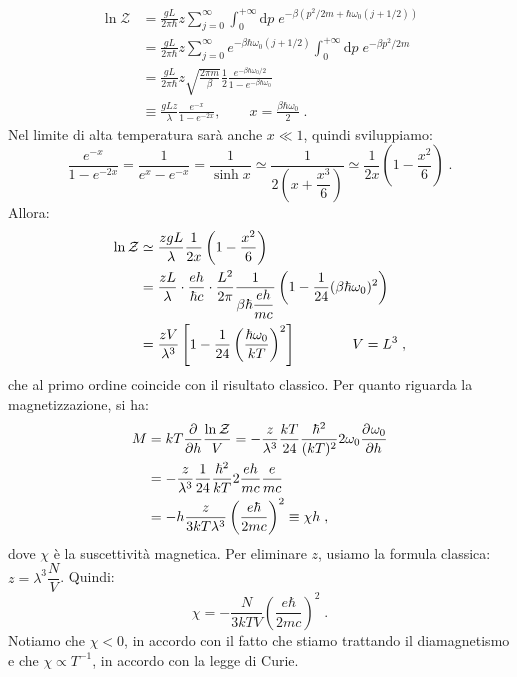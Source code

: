 \documentclass[10pt,a4paper]{report}
\theoremstyle{definition}
\newcommand{\pdev}[3][]{\frac{\partial^{#1} #2}{\partial #3^{#1}}}
\numberwithin{equation}{section}
\newcommand{\diff}[1][]{\mathrm{d}#1}
\newcommand{\zpart}{\mathcal{Z}}
\begin{document}
\begin{align*}
\ln\zpart&=\frac{gL}{2\pi\hbar}z\sum_{j=0}^{\infty}\int_0^{+\infty}\diff{p}\;e^{-\beta(p^2/2m+\hbar\omega_0(j+1/2))} \\
&= \frac{gL}{2\pi\hbar}z\sum_{j=0}^{\infty}e^{-\beta\hbar\omega_0(j+1/2)}\int_0^{+\infty}\diff{p}\;e^{-\beta p^2/2m} \\
&= \frac{gL}{2\pi\hbar}z\sqrt{\frac{2\pi m}{\beta}}\frac{1}{2}\frac{e^{-\beta\hbar\omega_0/2}}{1-e^{-\beta\hbar\omega_0}} \\
&\equiv \frac{gLz}{\lambda}\frac{e^{-x}}{1-e^{-2x}},\qquad x=\frac{\beta\hbar\omega_0}{2}\;.
\end{align*}
Nel limite di alta temperatura sarà anche $x\ll 1$, quindi sviluppiamo:
\begin{equation}
\frac{e^{-x}}{1-e^{-2x}}=\frac{1}{e^x-e^{-x}}=\frac{1}{\sinh x}\simeq \frac{1}{2\left(x+\dfrac{x^3}{6}\right)}\simeq \frac{1}{2x}\left(1-\frac{x^2}{6}\right)\;.
\end{equation}
Allora:
\begin{align}
\ln\zpart &\simeq \frac{zgL}{\lambda}\frac{1}{2x}\left(1-\frac{x^2}{6}\right) \notag \\
&= \frac{zL}{\lambda}\cdot \frac{eh}{\hbar c}\cdot\frac{L^2}{2\pi}\frac{1}{\beta\hbar\dfrac{eh}{mc}}\left(1-\frac{1}{24}(\beta\hbar\omega_0)^2\right) \notag \\
&=\frac{zV}{\lambda^3}\left[1-\frac{1}{24}\left(\frac{\hbar\omega_0}{kT}\right)^2\right]\qquad\qquad V=L^3\;,
\end{align}
che al primo ordine coincide con il risultato classico. Per quanto riguarda la magnetizzazione, si ha:
\begin{align}
M &= kT\frac{\partial}{\partial h}\frac{\ln\zpart}{V}=-\frac{z}{\lambda^3}\frac{kT}{24}\frac{\hbar^2}{(kT)^2}2\omega_0\pdev{\omega_0}{h} \notag \\
&= -\frac{z}{\lambda^3}\frac{1}{24}\frac{\hbar^2}{kT}2\frac{eh}{mc}\frac{e}{mc} \notag \\
&= -h\frac{z}{3kT\lambda^3}\left(\frac{e\hbar}{2mc}\right)^2\equiv \chi h\;,
\end{align}
dove $\chi$ è la suscettività magnetica. Per eliminare $z$, usiamo la formula classica: $z=\lambda^3\dfrac{N}{V}$. Quindi:
\begin{equation}
\chi=-\frac{N}{3kTV}\left(\frac{e\hbar}{2mc}\right)^2\;.
\end{equation}
Notiamo che $\chi<0$, in accordo con il fatto che stiamo trattando il diamagnetismo e che $\chi\propto T^{-1}$, in accordo con la legge di Curie. \\
\end{document}
